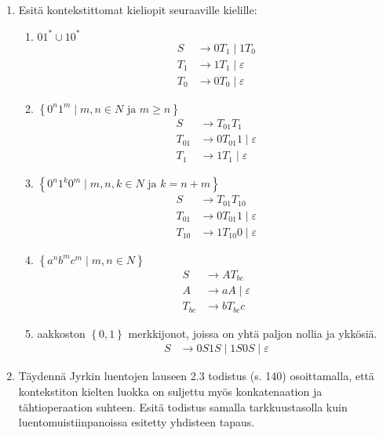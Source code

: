 \documentclass[a4paper,11pt]{article}
\newcommand{\set}[1]{{\left\{ #1 \right\}}}
\begin{document}
\begin{enumerate}
\item
  Esitä kontekstittomat  kieliopit seuraaville kielille:
  \begin{enumerate}
  \item $01^\ast\cup10^\ast$
    \begin{align*}
      S   & \to 0T_1 \mid 1T_0 \\
      T_1 & \to 1T_1 \mid \varepsilon \\
      T_0 & \to 0T_0 \mid \varepsilon
    \end{align*}
  \item $\set{0^n1^m\mid\mbox{$m,n\in N$ ja $m\geq n$}}$
    \begin{align*}
      S      & \to T_{01} T_1 \\
      T_{01} & \to 0T_{01}1 \mid \varepsilon \\
      T_{1}  & \to 1T_1 \mid \varepsilon
    \end{align*}
  \item $\set{0^n1^k0^m\mid\mbox{$m,n,k\in N$ ja $k=n+m$}}$
    \begin{align*}
      S & \to T_{01} T_{10} \\
      T_{01} & \to 0T_{01}1 \mid \varepsilon \\
      T_{10} & \to 1T_{10}0 \mid \varepsilon
    \end{align*}
  \item $\set{a^n b^m c^m\mid m,n\in N}$
    \begin{align*}
      S & \to AT_{bc} \\
      A & \to aA \mid \varepsilon \\
      T_{bc} & \to bT_{bc}c
    \end{align*}
  \item
    aakkoston $\set{0,1}$ merkkijonot, joissa on yhtä paljon nollia ja
    ykkösiä.
    \begin{align*}
      S & \to 0S1S \mid 1S0S \mid \varepsilon
    \end{align*}
  \end{enumerate}

\item
  Täydennä Jyrkin luentojen lauseen 2.3 todistus (s. 140)
  osoittamalla, että kontekstiton kielten luokka on suljettu myös
  konkatenaation ja tähtioperaation suhteen. Esitä todistus samalla
  tarkkuustasolla kuin luentomuistiinpanoissa esitetty yhdisteen
  tapaus.
  

\end{enumerate}
\end{document}
